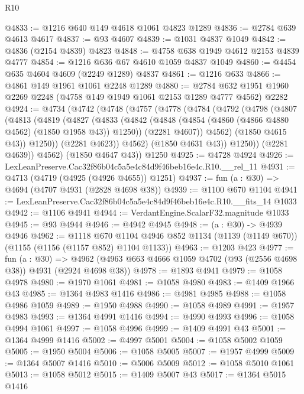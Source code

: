 \begin{lexlean}{R10}
\begin{coremodule}
@4833 := @1216 @640 @149 @4618 @1061 @4823 @1289
@4836 := @2784 @639 @4613 @4617
@4837 := @93 @4607
@4839 := @1031 @4837 @1049
@4842 := @4836 (@2154 @4839) @4823
@4848 := @4758 @638 @1949 @4612 @2153 @4839 @4777
@4854 := @1216 @636 @67 @4610 @1059 @4837 @1049
@4860 := @4454 @635 @4604 @4609 (@2249 @1289) @4837
@4861 := @1216 @633
@4866 := @4861 @149 @1961 @1061 @2248 @1289
@4880 := @2784 @632 @1951 @1960 @2269 @2248 (@4758 @149 @1949 @1061 @2153 @1289 @4777 @4562) @2282
@4924 := @4734
    (@4742
      (@4748
        (@4757
          (@4778
            (@4784
              (@4792
                (@4798
                  (@4807
                    (@4813
                      (@4819
                        (@4827
                          (@4833
                            (@4842
                              (@4848 (@4854 (@4860 (@4866 @4880 @4562) (@1850 @1958 @43)) @1250))
                              (@2281 @4607))
                            @4562)
                          (@1850 @4615 @43))
                        @1250))
                    (@2281 @4623))
                  @4562)
                (@1850 @4631 @43))
              @1250))
          (@2281 @4639))
        @4562)
      (@1850 @4647 @43))
    @1250
@4925 := @4728 @4924
@4926 := LexLeanPreserve.Cac32f86b04c5a5e4c84d9f46beb16e4c.R10.__rel_11
@4931 := @4713 (@4719 (@4925 (@4926 @4655)) @1251)
@4937 := fun (a : @30) => @4694 (@4707 @4931 (@2828 @4698 @38))
@4939 := @1100 @670 @1104
@4941 := LexLeanPreserve.Cac32f86b04c5a5e4c84d9f46beb16e4c.R10.__fits_14 @1033
@4942 := @1106 @4941
@4944 := VerdantEngine.ScalarF32.magnitude @1033
@4945 := @93 @4944
@4946 := @4942 @4945
@4948 := (a : @30) -> @4939 @4946
@4962 := @1118
    @670
    @1104
    @4946
    @852
    @1134
    (@1139 (@1149 @670))
    (@1155 (@1156 (@1157 @852) @1104 @1133))
@4963 := @1203 @423
@4977 := fun (a : @30) =>
  @4962 (@4963 @663 @4666 @1059 @4702 (@93 (@2556 @4698 @38)) @4931 (@2924 @4698 @38))
@4978 := @1893 @4941
@4979 := @1058 @4978
@4980 := @1970 @1061
@4981 := @1058 @4980
@4983 := @1409 @1966 @43
@4985 := @1364 @4983 @1416
@4986 := @4981 @4985
@4988 := @1058 @4986 @1059
@4989 := @1950 @4988
@4990 := @1058 @4989
@4991 := @1957 @4983
@4993 := @1364 @4991 @1416
@4994 := @4990 @4993
@4996 := @1058 @4994 @1061
@4997 := @1058 @4996
@4999 := @1409 @4991 @43
@5001 := @1364 @4999 @1416
@5002 := @4997 @5001
@5004 := @1058 @5002 @1059
@5005 := @1950 @5004
@5006 := @1058 @5005
@5007 := @1957 @4999
@5009 := @1364 @5007 @1416
@5010 := @5006 @5009
@5012 := @1058 @5010 @1061
@5013 := @1058 @5012
@5015 := @1409 @5007 @43
@5017 := @1364 @5015 @1416

\end{coremodule}
\end{lexlean}
